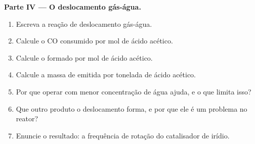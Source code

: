 \begin{problem}
\medskip\noindent\textbf{Parte IV --- O deslocamento gás-água.}
\begin{enumerate}[resume]
  \item Escreva a reação de deslocamento gás-água.
  \item Calcule o CO consumido por mol de ácido acético.
  \item Calcule o  formado por mol de ácido acético.
  \item Calcule a massa de  emitida por tonelada de ácido acético.
  \item Por que operar com menor concentração de água ajuda, e o que limita isso?
  \item Que outro produto o deslocamento forma, e por que ele é um problema no
        reator?
  \item Enuncie o resultado: a frequência de rotação do catalisador de irídio.
\end{enumerate}
\end{problem}
